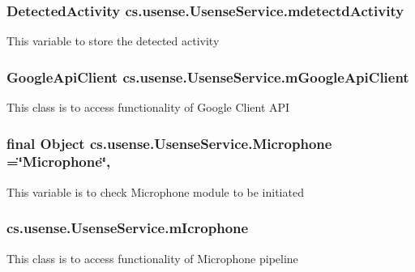 \subsubsection[{mdetectd\+Activity}]{\setlength{\rightskip}{0pt plus 5cm}Detected\+Activity cs.\+usense.\+Usense\+Service.\+mdetectd\+Activity\hspace{0.3cm}{\ttfamily [protected]}}\label{classcs_1_1usense_1_1_usense_service_ad4dd4b6f3a051c8a74ad961b9d49b1a7}
This variable to store the detected activity \hypertarget{classcs_1_1usense_1_1_usense_service_affdbe849b516c9fac9164abfecce9a13}{}
\subsubsection[{m\+Google\+Api\+Client}]{\setlength{\rightskip}{0pt plus 5cm}Google\+Api\+Client cs.\+usense.\+Usense\+Service.\+m\+Google\+Api\+Client\hspace{0.3cm}{\ttfamily [protected]}}\label{classcs_1_1usense_1_1_usense_service_affdbe849b516c9fac9164abfecce9a13}
This class is to access functionality of Google Client A\+P\+I \hypertarget{classcs_1_1usense_1_1_usense_service_a9e01e85451a3a948de9de1cff5bc9b74}{}
\subsubsection[{Microphone}]{\setlength{\rightskip}{0pt plus 5cm}final Object cs.\+usense.\+Usense\+Service.\+Microphone =\char`\"{}Microphone\char`\"{}\hspace{0.3cm}{\ttfamily [static]}, {\ttfamily [private]}}\label{classcs_1_1usense_1_1_usense_service_a9e01e85451a3a948de9de1cff5bc9b74}
This variable is to check Microphone module to be initiated \hypertarget{classcs_1_1usense_1_1_usense_service_a7f6a621051f5527dc7a126f0c8115483}{}
\subsubsection[{m\+Icrophone}]{ cs.\+usense.\+Usense\+Service.\+m\+Icrophone\hspace{0.3cm}{\ttfamily [private]}}\label{classcs_1_1usense_1_1_usense_service_a7f6a621051f5527dc7a126f0c8115483}
This class is to access functionality of Microphone pipeline \hypertarget{classcs_1_1usense_1_1_usense_service_a9233b9b84371bc77c397123c28f54f32}{}
